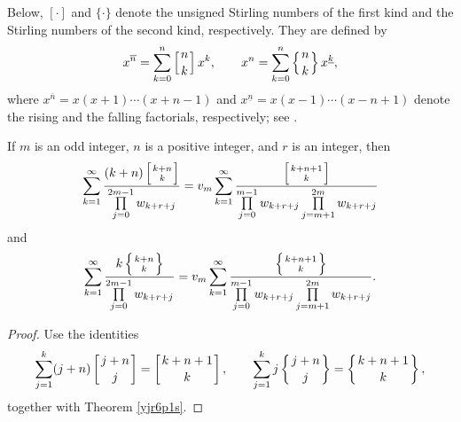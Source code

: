 \documentclass[12pt,reqno]{article}
\begin{document}
Below, $[\cdot]$ and $\{\cdot\}$ denote the unsigned Stirling numbers of the first kind and the Stirling numbers of the second kind, respectively. They are defined by
\[
x^{\overline{n}}
=\sum_{k=0}^{n}\left[{n\atop k}\right]x^k,
\qquad
x^n
=\sum_{k=0}^{n}\left\{{n\atop k}\right\}x^{\underline{k}},
\]
where
$x^{\overline{n}}=x(x+1)\cdots(x+n-1)$ and $x^{\underline{n}}=x(x-1)\cdots(x-n+1)$ denote the rising and the falling  factorials, respectively; see \cite{Graham}. 
\begin{proposition}
	If $m$ is an odd integer, $n$ is a positive integer, and $r$ is an integer, then
	\begin{equation*}
		\sum_{k=1}^{\infty}
		\frac{(k+n)\left[{k+n\atop k}\right]}
		{\prod\limits_{j=0}^{2m-1}w_{k+r+j}}
		=
		v_m
		\sum_{k=1}^{\infty}
		\frac{\left[{k+n+1\atop k}\right]}
		{\prod\limits_{j=0}^{m-1}w_{k+r+j}
			\prod\limits_{j=m+1}^{2m}w_{k+r+j}}
		\end{equation*}
and
\begin{equation*}
		\sum_{k=1}^{\infty}
		\frac{k\left\{{k+n\atop k}\right\}}
		{\prod\limits_{j=0}^{2m-1}w_{k+r+j}}
		=
		v_m
		\sum_{k=1}^{\infty}
		\frac{\left\{{k+n+1\atop k}\right\}}
		{\prod\limits_{j=0}^{m-1}w_{k+r+j}
			\prod\limits_{j=m+1}^{2m}w_{k+r+j}}.
		\end{equation*}
\end{proposition}
\begin{proof}
	Use the identities \cite[p.~251]{Graham}
	\[
	\sum_{j=1}^{k}(j+n)
	\left[{j+n\atop j}\right]
	=
	\left[{k+n+1\atop k}\right],
	\qquad
	\sum_{j=1}^{k}
	j\left\{{j+n\atop j}\right\}
	=
	\left\{{k+n+1\atop k}\right\},
	\]
	together with Theorem \ref{yjr6p1s}.
\end{proof}
\end{document}
